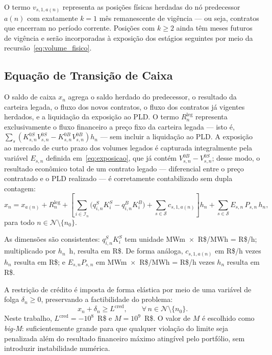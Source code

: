 O termo $v_{s,1,a(n)}$ representa as posi\c{c}\~oes f\'isicas herdadas do n\'o predecessor $a(n)$ com exatamente $k = 1$ m\^es remanescente de vig\^encia --- ou seja, contratos que encerram no per\'iodo corrente. Posi\c{c}\~oes com $k \geq 2$ ainda t\^em meses futuros de vig\^encia e ser\~ao incorporadas \`a exposi\c{c}\~ao dos est\'agios seguintes por meio da recurs\~ao~\eqref{eq:volume_fisico}.

\subsection{Equa\c{c}\~ao de Transi\c{c}\~ao de Caixa}
\label{subsec:transicao_caixa}

O saldo de caixa $x_n$ agrega o saldo herdado do predecessor, o resultado da carteira legada, o fluxo dos novos contratos, o fluxo dos contratos j\'a vigentes herdados, e a liquida\c{c}\~ao da exposi\c{c}\~ao ao PLD. O termo $R^{\text{leg}}_n$ representa exclusivamente o fluxo financeiro a pre\c{c}o fixo da carteira legada ---  isto \'e, $\sum_{s} (K^{0S}_{s,n} V^{0S}_{s,n} - K^{0B}_{s,n} V^{0B}_{s,n}) h_n$ --- sem incluir a liquida\c{c}\~ao ao PLD. A exposi\c{c}\~ao ao mercado de curto prazo dos volumes legados \'e capturada integralmente pela vari\'avel $E_{s,n}$ definida em~\eqref{eq:exposicao}, que j\'a cont\'em $V^{0B}_{s,n} - V^{0S}_{s,n}$; desse modo, o resultado econ\^omico total de um contrato legado --- diferencial entre o pre\c{c}o contratado e o PLD realizado --- \'e corretamente contabilizado sem dupla contagem:
%
\begin{equation}
  x_n = x_{a(n)} + R^{\text{leg}}_n
  + \left[\sum_{i \in \mathcal{I}_n}\!\bigl(q^S_{i,n} K^S_i - q^B_{i,n} K^B_i\bigr)
  + \sum_{s \in \mathcal{S}} c_{s,1,a(n)}\right] h_n
  + \sum_{s \in \mathcal{S}} E_{s,n}\, P_{s,n}\, h_n,
  \label{eq:transicao_caixa}
\end{equation}
%
para todo $n \in \mathcal{N} \setminus \{n_0\}$.

As dimens\~oes s\~ao consistentes: $q^S_{i,n} K^S_i$ tem unidade MWm~$\times$~R\$/MWh = R\$/h; multiplicado por $h_n$~h, resulta em R\$. De forma an\'aloga, $c_{s,1,a(n)}$ em R\$/h vezes $h_n$ resulta em R\$; e $E_{s,n} P_{s,n}$ em MWm~$\times$~R\$/MWh = R\$/h vezes $h_n$ resulta em R\$.

A restri\c{c}\~ao de cr\'edito \'e imposta de forma el\'astica por meio de uma vari\'avel de folga $\delta_n \geq 0$, preservando a factibilidade do problema:
%
\begin{equation}
  x_n + \delta_n \geq L^{\text{cred}}, \qquad \forall\, n \in \mathcal{N} \setminus \{n_0\}.
  \label{eq:restricao_credito}
\end{equation}
%
Neste trabalho, $L^{\text{cred}} = -10^8$~R\$ e $M = 10^9$~R\$. O valor de $M$ \'e escolhido como \emph{big-M}: suficientemente grande para que qualquer viola\c{c}\~ao do limite seja penalizada al\'em do resultado financeiro m\'aximo ating\'ivel pelo portf\'olio, sem introduzir instabilidade num\'erica.

